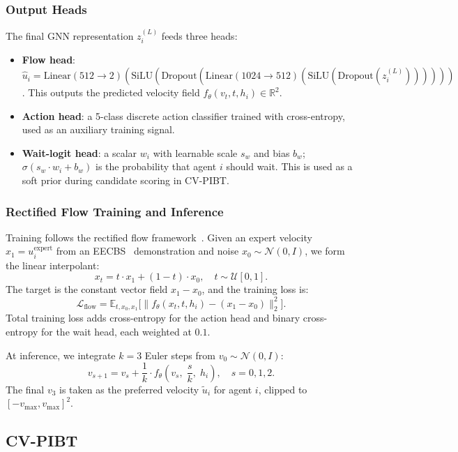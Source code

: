 \subsubsection{Output Heads}

The final GNN representation $z_i^{(L)}$ feeds three heads:
\begin{itemize}
  \item \textbf{Flow head}: $\hat{u}_i = \text{Linear}(512 \to 2)(\text{SiLU}(\text{Dropout}(\text{Linear}(1024 \to 512)(\text{SiLU}(\text{Dropout}(z_i^{(L)}))))))$. This outputs the predicted velocity field $f_\theta(v_t, t, h_i) \in \mathbb{R}^2$.
  \item \textbf{Action head}: a 5-class discrete action classifier trained with cross-entropy, used as an auxiliary training signal.
  \item \textbf{Wait-logit head}: a scalar $w_i$ with learnable scale $s_w$ and bias $b_w$; $\sigma(s_w \cdot w_i + b_w)$ is the probability that agent $i$ should wait. This is used as a soft prior during candidate scoring in CV-PIBT.
\end{itemize}

\subsubsection{Rectified Flow Training and Inference}

Training follows the rectified flow framework~\cite{liu2023rectifiedflow}. Given an expert velocity $x_1 = u_i^{\text{expert}}$ from an EECBS~\cite{li2021eecbs} demonstration and noise $x_0 \sim \mathcal{N}(0, I)$, we form the linear interpolant:
\[
  x_t = t \cdot x_1 + (1 - t) \cdot x_0, \quad t \sim \mathcal{U}[0,1].
\]
The target is the constant vector field $x_1 - x_0$, and the training loss is:
\[
  \mathcal{L}_{\text{flow}} = \mathbb{E}_{t, x_0, x_1}\bigl[\|f_\theta(x_t, t, h_i) - (x_1 - x_0)\|_2^2\bigr].
\]
Total training loss adds cross-entropy for the action head and binary cross-entropy for the wait head, each weighted at $0.1$.

At inference, we integrate $k=3$ Euler steps from $v_0 \sim \mathcal{N}(0, I)$:
\[
  v_{s+1} = v_s + \frac{1}{k} \cdot f_\theta\!\left(v_s,\; \frac{s}{k},\; h_i\right), \quad s = 0, 1, 2.
\]
The final $v_3$ is taken as the preferred velocity $\tilde{u}_i$ for agent $i$, clipped to $[-v_{\max}, v_{\max}]^2$.

\subsection{CV-PIBT}
\label{sec:method:shield}

